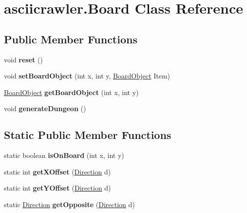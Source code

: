 \hypertarget{classasciicrawler_1_1Board}{}\section{asciicrawler.\+Board Class Reference}
\label{classasciicrawler_1_1Board}
\subsection*{Public Member Functions}
\begin{DoxyCompactItemize}
\item 
\mbox{\label{classasciicrawler_1_1Board_aa6d40676bda8efa863277524168d575d}} 
void {\bfseries reset} ()
\item 
\mbox{\label{classasciicrawler_1_1Board_ab1cf721c223fcdafc141fe858c243d60}} 
void {\bfseries set\+Board\+Object} (int x, int y, \hyperlink{classasciicrawler_1_1BoardObject}{Board\+Object} Item)
\item 
\mbox{\label{classasciicrawler_1_1Board_a059f9044f0d0f6dc9c5729c9c8c082a2}} 
\hyperlink{classasciicrawler_1_1BoardObject}{Board\+Object} {\bfseries get\+Board\+Object} (int x, int y)
\item 
\mbox{\label{classasciicrawler_1_1Board_af8fabfec19cd00bb4205e656c505789f}} 
void {\bfseries generate\+Dungeon} ()
\end{DoxyCompactItemize}
\subsection*{Static Public Member Functions}
\begin{DoxyCompactItemize}
\item 
\mbox{\label{classasciicrawler_1_1Board_abf113bdc50898a0f64eb3611b98111ea}} 
static boolean {\bfseries is\+On\+Board} (int x, int y)
\item 
\mbox{\label{classasciicrawler_1_1Board_a3ec369e192af66b0aa62f0a5ed5f18b0}} 
static int {\bfseries get\+X\+Offset} (\hyperlink{enumasciicrawler_1_1Direction}{Direction} d)
\item 
\mbox{\label{classasciicrawler_1_1Board_a8de1ca8752186e89183ec33c24316c41}} 
static int {\bfseries get\+Y\+Offset} (\hyperlink{enumasciicrawler_1_1Direction}{Direction} d)
\item 
\mbox{\label{classasciicrawler_1_1Board_a115e44d78ee7c3edbd83dba743433634}} 
static \hyperlink{enumasciicrawler_1_1Direction}{Direction} {\bfseries get\+Opposite} (\hyperlink{enumasciicrawler_1_1Direction}{Direction} d)
\end{DoxyCompactItemize}
